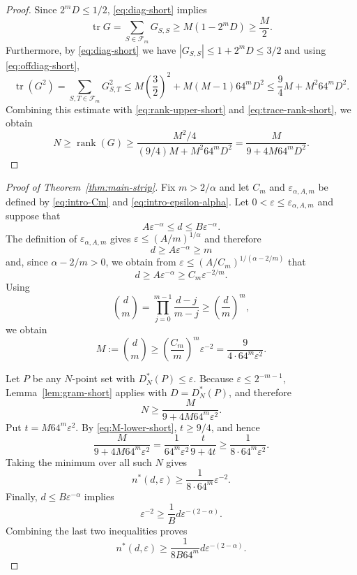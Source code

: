 \documentclass[11pt]{article}
\theoremstyle{plain}
\theoremstyle{remark}
\theoremstyle{definition}
\newcommand{\1}{\mathbf{1}}
\newcommand{\tr}{\operatorname{tr}}
\newcommand{\rank}{\operatorname{rank}}
\begin{document}
\begin{proof}
Since \(2^mD\le1/2\), \eqref{eq:diag-short} implies
\[
 \tr G = \sum_{S \in \mathcal{F}_m } G_{S,S} \ge M (1 - 2^m D) \ge \frac M2.
\]
Furthermore, by \eqref{eq:diag-short} we have $|G_{S,S}| \le 1 + 2^m D \le 3/2$ and  using \eqref{eq:offdiag-short},
\[
 \tr(G^2)
 =
 \sum_{S,T\in\mathcal F_m}G_{S,T}^2
 \le
 M\left(\frac32\right)^2
 +M(M-1)64^mD^2
 \le
 \frac94M+M^2 64^mD^2.
\]
Combining this estimate with \eqref{eq:rank-upper-short} and
\eqref{eq:trace-rank-short}, we obtain
\[
 N \ge \rank(G)
 \ge
 \frac{M^2/4}{(9/4)M+M^2 64^mD^2}
 =
 \frac{M}{9+4M64^mD^2}.
\]
\end{proof}

\begin{proof}[Proof of Theorem~\ref{thm:main-strip}]
Fix \(m>2/\alpha\) and let \(C_m\) and
\(\varepsilon_{\alpha,A,m}\) be defined by
\eqref{eq:intro-Cm} and \eqref{eq:intro-epsilon-alpha}.  Let
\(0<\varepsilon\le\varepsilon_{\alpha,A,m}\) and suppose that
\[
 A\varepsilon^{-\alpha}\le d\le B\varepsilon^{-\alpha}.
\]
The definition of \(\varepsilon_{\alpha,A,m}\) gives $\varepsilon \le (A/m)^{1/\alpha}$ and therefore
\[
 d\ge A\varepsilon^{-\alpha}\ge m
\]
and, since \(\alpha-2/m>0\), we obtain from $\varepsilon \le (A/C_m)^{1/(\alpha - 2/m)}$ that
\[
 d\ge A\varepsilon^{-\alpha}
 \ge C_m\varepsilon^{-2/m}.
\]
Using
\[
 \binom dm
 =
 \prod_{j=0}^{m-1}\frac{d-j}{m-j}
 \ge\left(\frac dm\right)^m,
\]
we obtain
\begin{equation}\label{eq:M-lower-short}
 M:=\binom dm
 \ge
 \left(\frac{C_m}{m}\right)^m\varepsilon^{-2}
 =
 \frac9{4\cdot64^m\varepsilon^2}.
\end{equation}

Let \(P\) be any \(N\)-point set with \(D_N^\ast(P)\le\varepsilon\).
Because \(\varepsilon\le2^{-m-1}\), Lemma~\ref{lem:gram-short} applies
with \(D=D_N^\ast(P)\), and therefore
\[
 N
 \ge
 \frac{M}{9+4M64^m\varepsilon^2}.
\]
Put \(t=M64^m\varepsilon^2\).  By \eqref{eq:M-lower-short},
\(t\ge9/4\), and hence
\[
 \frac{M}{9+4M64^m\varepsilon^2}
 =
 \frac1{64^m\varepsilon^2}\frac{t}{9+4t}
 \ge
 \frac1{8\cdot64^m\varepsilon^2}.
\]
Taking the minimum over all such \(N\) gives
\[
 n^\ast(d,\varepsilon)
 \ge
 \frac1{8\cdot64^m}\varepsilon^{-2}.
\]
Finally, \(d\le B\varepsilon^{-\alpha}\) implies
\[
 \varepsilon^{-2}
 \ge
 \frac1B d\varepsilon^{-(2-\alpha)}.
\]
Combining the last two inequalities proves
\[
 n^\ast(d,\varepsilon)
 \ge
 \frac1{8B64^m}
 d\varepsilon^{-(2-\alpha)}.
\]
\end{proof}
\end{document}
